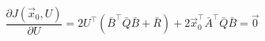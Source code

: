 \documentclass{article}
\begin{document}
\thispagestyle{empty}
$$
\frac{\partial J(\vec{x}_0,U)}{\partial U} = 2 U^\top(\bar{B}^\top\bar{Q}\bar{B} + \bar{R}) + 2 \vec{x}_0^\top \bar{A}^\top \bar{Q} \bar{B} = \vec{0}
$$
\end{document}
